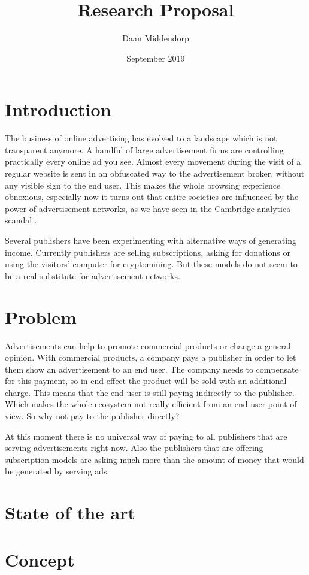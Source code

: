 \documentclass[]{article}
\title{Research Proposal}
\author{Daan Middendorp}
\date{September 2019}
\begin{document}
\maketitle

\section{Introduction}
The business of online advertising has evolved to a landscape which is not transparent anymore. A handful of large advertisement firms are controlling practically every online ad you see. Almost every movement during the visit of a regular website is sent in an obfuscated way to the advertisement broker, without any visible sign to the end user. This makes the whole browsing experience obnoxious, especially now it turns out that entire societies are influenced by the power of advertisement networks, as we have seen in the Cambridge analytica scandal .

Several publishers have been experimenting with alternative ways of generating income. Currently publishers are selling subscriptions, asking for donations or using the visitors' computer for cryptomining. But these models do not seem to be a real substitute for advertisement networks.

\section{Problem}
Advertisements can help to promote commercial products or change a general opinion. With commercial products, a company pays a publisher in order to let them show an advertisement to an end user. The company needs to compensate for this payment, so in end effect the product will be sold with an additional charge. This means that the end user is still paying indirectly to the publisher. Which makes the whole ecosystem not really efficient from an end user point of view. So why not pay to the publisher directly?

At this moment there is no universal way of paying to all publishers that are serving advertisements right now. Also the publishers that are offering subscription models are asking much more than the amount of money that would be generated by serving ads.

\section{State of the art}

\section {Concept}
\end{document}

